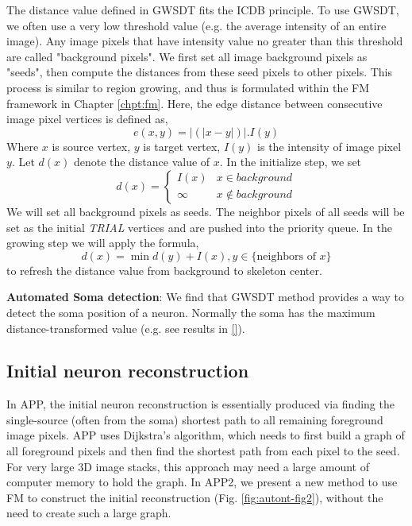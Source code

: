 The distance value defined in GWSDT fits the ICDB principle. To use GWSDT, we often use a very low threshold value (e.g. the average intensity of an entire image). Any image pixels that have intensity value no greater than this threshold are called "background pixels". We first set all image background pixels as "seeds", then compute the distances from these seed pixels to other pixels. This process is similar to region growing, and thus is formulated within the FM framework in Chapter \ref{chpt:fm}. Here, the edge distance between consecutive image pixel vertices is defined as,
\begin{equation}
e(x,y)=|(|x-y|)|.I(y)
\end{equation}
Where $x$ is source vertex, $y$ is target vertex, $I(y)$ is the intensity of image pixel $y$. Let $d(x)$ denote the distance value of $x$. In the initialize step, we set
\begin{equation}
d(x)= \left\{
\begin{array}{rl}
I(x)  & x \in {background} \\
\infty &    x \notin {background } 
\end{array}
\right.
\end{equation}
We will set all background pixels as seeds. The neighbor pixels of all seeds will be set as the initial \emph{TRIAL} vertices and are pushed into the priority queue. In the growing step we will apply the formula,
\begin{equation}
d(x)=\min⁡{d(y)+ I(x)},y \in \{\mbox{neighbors of }x\}
\end{equation}
to refresh the distance value from background to skeleton center.

\textbf{Automated Soma detection}: We find that GWSDT method provides a way to detect the soma position of a neuron. Normally the soma has the maximum distance-transformed value (e.g. see results in \ref{}).

\subsection{Initial neuron reconstruction}\label{sec:init-nt}
In APP, the initial neuron reconstruction is essentially produced via finding the single-source (often from the soma) shortest path to all remaining foreground image pixels. APP uses Dijkstra’s algorithm, which needs to first build a graph of all foreground pixels and then find the shortest path from each pixel to the seed. For very large 3D image stacks, this approach may need a large amount of computer memory to hold the graph. In APP2, we present a new method to use FM to construct the initial reconstruction (Fig. \ref{fig:autont-fig2}), without the need to create such a large graph. 

